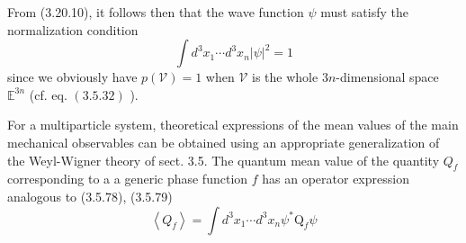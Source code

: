 \documentclass{article}
\begin{document}
From (3.20.10), it follows then that the wave function $\psi$ must satisfy the normalization condition
$$
\begin{equation*}
\int d^{3} x_{1} \cdots d^{3} x_{n}|\psi|^{2}=1 \tag{3.20.13}
\end{equation*}
$$
since we obviously have $p(\mathcal{V})=1$ when $\mathcal{V}$ is the whole $3 n$-dimensional space $\mathbb{E}^{3 n}$ (cf. eq. $(3.5 .32)$ ).

For a multiparticle system, theoretical expressions of the mean values of the main mechanical observables can be obtained using an appropriate generalization
of the Weyl-Wigner theory of sect. 3.5.
The quantum mean value of the quantity $Q_{f}$ corresponding to a a generic phase function $f$ has an operator expression analogous to (3.5.78), (3.5.79)
$$
\begin{equation*}
\left\langle Q_{f}\right\rangle=\int d^{3} x_{1} \cdots d^{3} x_{n} \psi^{*} \mathrm{Q}_{f} \psi \tag{3.20.14}
\end{equation*}
$$
\end{document}

